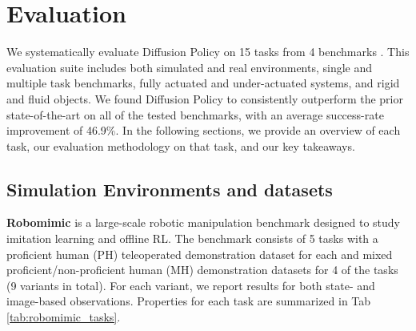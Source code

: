 \documentclass[Afour,sageh,times]{sagej}
\begin{document}
\section{Evaluation}
We systematically evaluate Diffusion Policy on 15 tasks from 4 benchmarks \cite{ibc, gupta2019relay, robomimic, bet}. This evaluation suite includes both simulated and real environments, single and multiple task benchmarks, fully actuated and under-actuated systems, and rigid and fluid objects.  We found Diffusion Policy to consistently outperform the prior state-of-the-art on all of the tested benchmarks, with an average success-rate improvement of 46.9\%. In the following sections, we  provide an overview of each task, our evaluation methodology on that task, and our key takeaways.

\subsection{Simulation Environments and datasets}
\textbf{Robomimic}
\cite{robomimic} is a large-scale robotic manipulation benchmark designed to study imitation learning and offline RL. The benchmark consists of 5 tasks with a proficient human (PH) teleoperated demonstration dataset for each and mixed proficient/non-proficient human (MH) demonstration datasets for 4 of the tasks (9 variants in total). For each variant, we report results for both state- and image-based observations. Properties for each task are summarized in Tab \ref{tab:robomimic_tasks}.
\end{document}
